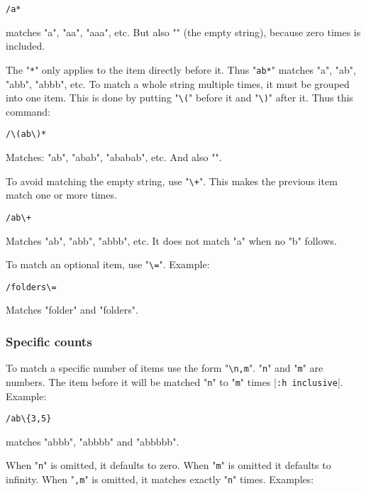 \begin{Verbatim}[samepage=true]
 /a*
\end{Verbatim}

matches "a", "aa", "aaa", etc.
But also "" (the empty string), because zero times is included.

The "\texttt{*}" only applies to the item directly before it.
Thus "\texttt{ab*}" matches "a", "ab", "abb", "abbb", etc.
To match a whole string multiple times, it must be grouped into one item.
This is done by putting "\texttt{\textbackslash{}(}" before it and "\texttt{\textbackslash{})}" after it.
Thus this command:

\begin{Verbatim}[samepage=true]
 /\(ab\)*
\end{Verbatim}

Matches: "ab", "abab", "ababab", etc.  And also "".

To avoid matching the empty string, use "\texttt{\textbackslash{}+}".
This makes the previous item match one or more times.

\begin{Verbatim}[samepage=true]
 /ab\+
\end{Verbatim}

Matches "ab", "abb", "abbb", etc.
It does not match "a" when no "b" follows.

To match an optional item, use "\texttt{\textbackslash{}=}".
Example:

\begin{Verbatim}[samepage=true]
 /folders\=
\end{Verbatim}

Matches "folder" and "folders".
\subsubsection{Specific counts}
To match a specific number of items use the form "\texttt{\textbackslash{}{n,m}}".
"\texttt{n}" and "\texttt{m}" are numbers.
The item before it will be matched "\texttt{n}" to "\texttt{m}" times |\texttt{:h inclusive}|.
Example:

\begin{Verbatim}[samepage=true]
 /ab\{3,5}
\end{Verbatim}

matches "abbb", "abbbb" and "abbbbb".

When "\texttt{n}" is omitted, it defaults to zero.
When "\texttt{m}" is omitted it defaults to infinity.
When "\texttt{,m}" is omitted, it matches exactly "\texttt{n}" times.
Examples:


